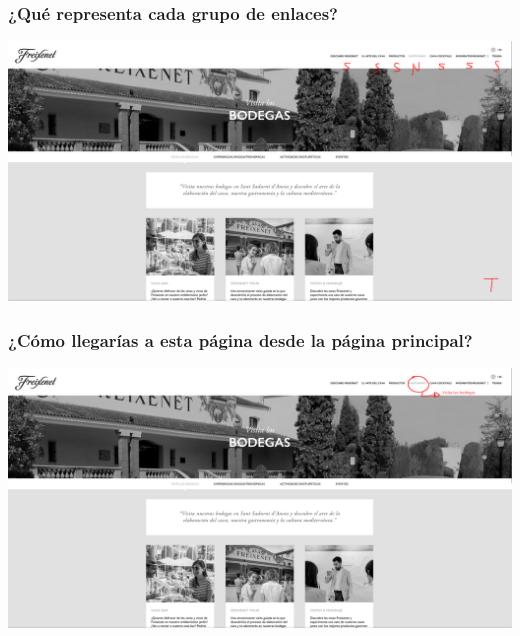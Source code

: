 \documentclass[spanish]{article}
\begin{document}
\subsubsection{¿Qué representa cada grupo de enlaces?}

\begin{center}
        \includegraphics[scale=.1]{../img/8.png}
\end{center}

\subsubsection{¿Cómo llegarías a esta página desde la página principal?}

\begin{center}
        \includegraphics[scale=.1]{../img/9.png}
\end{center}

\newpage
\end{document}
